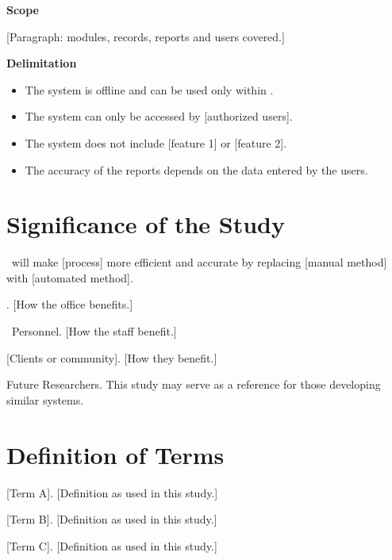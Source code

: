 \noindent\textbf{Scope}

[Paragraph: modules, records, reports and users covered.]

\noindent\textbf{Delimitation}

\begin{itemize}[leftmargin=0.75in,itemsep=0pt,topsep=3pt]
  \item The system is offline and can be used only within \OfficeName.
  \item The system can only be accessed by [authorized users].
  \item The system does not include [feature 1] or [feature 2].
  \item The accuracy of the reports depends on the data entered by the users.
\end{itemize}

\section{Significance of the Study}
\SystemName\ will make [process] more efficient and accurate by replacing [manual method] with [automated method].

\OfficeName. [How the office benefits.]

\OfficeName\ Personnel. [How the staff benefit.]

[Clients or community]. [How they benefit.]

Future Researchers. This study may serve as a reference for those developing similar systems.

\section{Definition of Terms}
[Term A]. [Definition as used in this study.]

[Term B]. [Definition as used in this study.]

[Term C]. [Definition as used in this study.]
